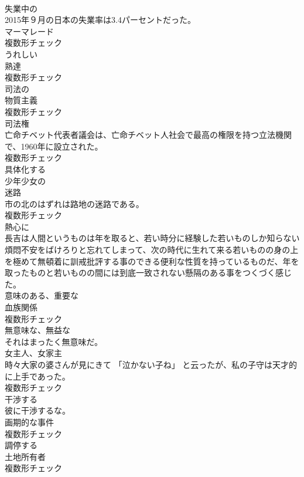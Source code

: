 \documentclass[8pt]{extreport}
\begin{document}
\begin{CJK}{UTF8}{min}
\\	[形容詞]	失業中の	
\\	2015年９月の日本の失業率は3.4パーセントだった。	
\\	[名詞]	マーマレード	
\\	複数形チェック
\\	[形容詞]	うれしい	
\\	[名詞]	熟達	
\\	複数形チェック
\\	[形容詞]	司法の	
\\	[名詞]	物質主義	
\\	複数形チェック
\\	[名詞]	司法権	
\\	亡命チベット代表者議会は、亡命チベット人社会で最高の権限を持つ立法機関で、1960年に設立された。	
\\	複数形チェック
\\	[動詞]	具体化する	
\\	[形容詞]	少年少女の	
\\	[名詞]	迷路	
\\	市の北のはずれは路地の迷路である。	
\\	複数形チェック
\\	[副詞]	熱心に	
\\	長吉は人間というものは年を取ると、若い時分に経験した若いものしか知らない煩悶不安をばけろりと忘れてしまって、次の時代に生れて来る若いものの身の上を極めて無頓着に訓戒批評する事のできる便利な性質を持っているものだ、年を取ったものと若いものの間には到底一致されない懸隔のある事をつくづく感じた。	
\\	[形容詞]	意味のある、重要な	
\\	[名詞]	血族関係	
\\	複数形チェック
\\	[形容詞]	無意味な、無益な	
\\	それはまったく無意味だ。	
\\	[名詞]	女主人、女家主	
\\	時々大家の婆さんが見にきて 「泣かない子ね」 と云ったが、私の子守は天才的に上手であった。	
\\	複数形チェック
\\	[動詞]	干渉する	
\\	彼に干渉するな。	
\\	[名詞]	画期的な事件	
\\	複数形チェック
\\	[動詞]	調停する	
\\	[名詞]	土地所有者	
\\	複数形チェック

\end{CJK}
\end{document}
